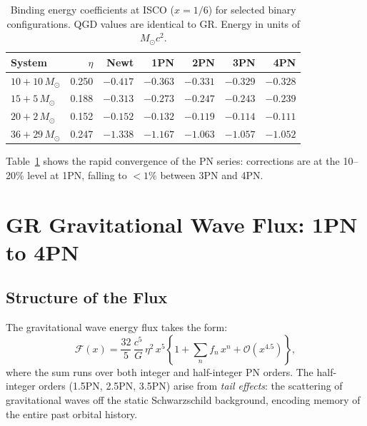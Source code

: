 \documentclass[11pt,a4paper]{article}
\newcommand{\Ms}{M_\odot}
\theoremstyle{definition}
\theoremstyle{remark}
\begin{document}
	\begin{table}[ht]
		\centering
		\caption{Binding energy coefficients at ISCO ($x=1/6$) for selected
			binary configurations.  QGD values are identical to GR.
			Energy in units of $\Ms c^2$.}
		\label{tab:binding_energy}
		\renewcommand{\arraystretch}{1.35}
		\begin{tabular}{lrrrrrr}
			\toprule
			System & $\eta$ & Newt & 1PN & 2PN & 3PN & 4PN \\
			\midrule
			$10{+}10\,\Ms$  & 0.250 & $-0.417$ & $-0.363$ & $-0.331$ & $-0.329$ & $-0.328$ \\
			$15{+}5\,\Ms$   & 0.188 & $-0.313$ & $-0.273$ & $-0.247$ & $-0.243$ & $-0.239$ \\
			$20{+}2\,\Ms$   & 0.152 & $-0.152$ & $-0.132$ & $-0.119$ & $-0.114$ & $-0.111$ \\
			$36{+}29\,\Ms$  & 0.247 & $-1.338$ & $-1.167$ & $-1.063$ & $-1.057$ & $-1.052$ \\
			\bottomrule
		\end{tabular}
	\end{table}
	
	Table~\ref{tab:binding_energy} shows the rapid convergence of the PN
	series: corrections are at the 10--20\% level at 1PN, falling to
	$<1\%$ between 3PN and 4PN.
	
	\section{GR Gravitational Wave Flux: 1PN to 4PN}
	\label{sec:flux}
	
	\subsection{Structure of the Flux}
	
	The gravitational wave energy flux takes the form:
	\begin{equation}
		\mathcal{F}(x)
		= \frac{32}{5}\,\frac{c^5}{G}\,\eta^2\,x^5\!
		\left\{1 + \sum_{n} f_n\,x^n + \mathcal{O}(x^{4.5})\right\},
		\label{eq:flux}
	\end{equation}
	where the sum runs over both integer and half-integer PN orders.
	The half-integer orders (1.5PN, 2.5PN, 3.5PN) arise from
	\emph{tail effects}: the scattering of gravitational waves off the
	static Schwarzschild background, encoding memory of the entire past
	orbital history.
	
\end{document}

